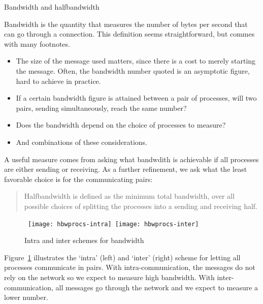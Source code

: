 
 {Bandwidth and halfbandwidth}

Bandwidth is the quantity that measures the number of bytes per second that
can go through a connection.
This definition seems straightforward, but commes with many footnotes.
\begin{itemize}
\item The size of the message used matters, since there is a 
  cost to merely starting the message. Often, the bandwidth number quoted
  is an asymptotic figure, hard to achieve in practice.
\item If a certain bandwidth figure is attained between a pair of processes,
  will two pairs, sending simultaneously, reach the same number?
\item Does the bandwidth depend on the choice of processes to measure?
\item And combinations of these considerations.
\end{itemize}

A useful measure comes from asking what bandwdith is achievable if all processes
are either sending or receiving.
As a further refinement, we ask what the least favorable choice is
for the communicating pairs:
\begin{quote}
  Halfbandwidth is defined as the minimum total bandwidth,
  over all possible choices of splitting the processes into
  a sending and receiving half.
\end{quote}

\begin{figure}[ht]
  \hbox\bgroup  %
  \texttt{[image: hbwprocs-intra]}
  \hss  %
  \texttt{[image: hbwprocs-inter]}
  \hss  %
  \egroup  %
  \caption{Intra and inter schemes for bandwidth}
  \label{fig:interintra}
\end{figure}

Figure~\ref{fig:interintra} illustrates the `intra' (left)
and `inter' (right) scheme for letting all processes
communicate in pairs.
With intra-communication, the messages do not rely on the network
so we expect to measure high bandwidth.
With inter-communication, all messages go through the network
and we expect to measure a lower number.

